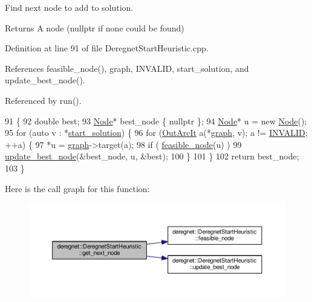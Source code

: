 Find next node to add to solution. 

\begin{DoxyReturn}{Returns}
A node (nullptr if none could be found) 
\end{DoxyReturn}


Definition at line 91 of file Deregnet\+Start\+Heuristic.\+cpp.



References feasible\+\_\+node(), graph, I\+N\+V\+A\+L\+ID, start\+\_\+solution, and update\+\_\+best\+\_\+node().



Referenced by run().


\begin{DoxyCode}
91                                             \{
92     \textcolor{keywordtype}{double} best;
93     \hyperlink{namespacederegnet_a744bad34f2de9856d36715a445f027f3}{Node}* best\_node \{ \textcolor{keyword}{nullptr} \};
94     \hyperlink{namespacederegnet_a744bad34f2de9856d36715a445f027f3}{Node}* u = \textcolor{keyword}{new} \hyperlink{namespacederegnet_a744bad34f2de9856d36715a445f027f3}{Node}();
95     \textcolor{keywordflow}{for} (\textcolor{keyword}{auto} v : *\hyperlink{classderegnet_1_1DeregnetStartHeuristic_a7450e11ca0a265b055f95e7832b65e2f}{start\_solution}) \{
96         \textcolor{keywordflow}{for} (\hyperlink{namespacederegnet_a253cef939ea250e4cc0c967cd0117853}{OutArcIt} a(*\hyperlink{classderegnet_1_1DeregnetStartHeuristic_a4da8e53fc7c0fa3dbe0e3ef07296d75e}{graph}, v); a != \hyperlink{usinglemon_8hpp_adf770fe2eec438e3758ffe905dbae208}{INVALID}; ++a) \{
97             *u = \hyperlink{classderegnet_1_1DeregnetStartHeuristic_a4da8e53fc7c0fa3dbe0e3ef07296d75e}{graph}->target(a);
98             \textcolor{keywordflow}{if} ( \hyperlink{classderegnet_1_1DeregnetStartHeuristic_ac296c4f122f7d3ad2fcc2cbb0d1b5379}{feasible\_node}(u) )
99                 \hyperlink{classderegnet_1_1DeregnetStartHeuristic_a50179ff9db4d416b93ff41d1dcee1358}{update\_best\_node}(&best\_node, u, &best);
100         \}
101     \}
102     \textcolor{keywordflow}{return} best\_node;
103 \}
\end{DoxyCode}
Here is the call graph for this function\+:\nopagebreak
\begin{figure}[H]
\begin{center}
\leavevmode
\includegraphics[width=350pt]{classderegnet_1_1DeregnetStartHeuristic_a6ec478444151e54625951f858ff76761_cgraph}
\end{center}
\end{figure}
